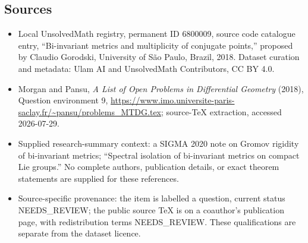 \documentclass[11pt]{article}
\begin{document}
\subsection{Sources}
\begin{itemize}
\item Local UnsolvedMath registry, permanent ID 6800009, source code catalogue entry, ``Bi-invariant metrics and multiplicity of conjugate points,'' proposed by Claudio Gorodski, University of São Paulo, Brazil, 2018. Dataset curation and metadata: Ulam AI and UnsolvedMath Contributors, CC BY 4.0.
\item Morgan and Pansu, \emph{A List of Open Problems in Differential Geometry} (2018), Question environment 9, \url{https://www.imo.universite-paris-saclay.fr/~pansu/problems_MTDG.tex}; source-TeX extraction, accessed 2026-07-29.
\item Supplied research-summary context: a SIGMA 2020 note on Gromov rigidity of bi-invariant metrics; ``Spectral isolation of bi-invariant metrics on compact Lie groups.'' No complete authors, publication details, or exact theorem statements are supplied for these references.
\item Source-specific provenance: the item is labelled a question, current status NEEDS\_REVIEW; the public source TeX is on a coauthor's publication page, with redistribution terms NEEDS\_REVIEW. These qualifications are separate from the dataset licence.
\end{itemize}
\end{document}
